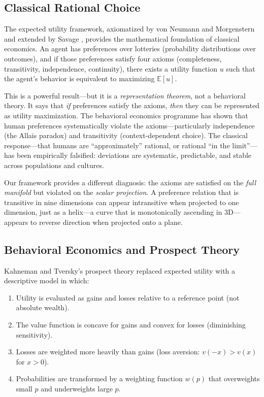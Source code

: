 \documentclass[12pt]{article}
\theoremstyle{definition}
\theoremstyle{remark}
\begin{document}
\subsection{Classical Rational Choice}

The expected utility framework, axiomatized by von Neumann and Morgenstern \cite{vonneumann1944} and extended by Savage \cite{savage1954}, provides the mathematical foundation of classical economics.  An agent has preferences over lotteries (probability distributions over outcomes), and if those preferences satisfy four axioms (completeness, transitivity, independence, continuity), there exists a utility function $u$ such that the agent's behavior is equivalent to maximizing $\mathbb{E}[u]$.

This is a powerful result---but it is a \emph{representation theorem}, not a behavioral theory.  It says that \emph{if} preferences satisfy the axioms, \emph{then} they can be represented as utility maximization.  The behavioral economics programme has shown that human preferences systematically violate the axioms---particularly independence (the Allais paradox) and transitivity (context-dependent choice).  The classical response---that humans are ``approximately'' rational, or rational ``in the limit''---has been empirically falsified: deviations are systematic, predictable, and stable across populations and cultures.

Our framework provides a different diagnosis: the axioms are satisfied on the \emph{full manifold} but violated on the \emph{scalar projection}.  A preference relation that is transitive in nine dimensions can appear intransitive when projected to one dimension, just as a helix---a curve that is monotonically ascending in 3D---appears to reverse direction when projected onto a plane.

\subsection{Behavioral Economics and Prospect Theory}

Kahneman and Tversky's prospect theory \cite{kahneman1979} replaced expected utility with a descriptive model in which:
\begin{enumerate}
    \item Utility is evaluated as gains and losses relative to a reference point (not absolute wealth).
    \item The value function is concave for gains and convex for losses (diminishing sensitivity).
    \item Losses are weighted more heavily than gains (loss aversion: $v(-x) > v(x)$ for $x > 0$).
    \item Probabilities are transformed by a weighting function $w(p)$ that overweights small $p$ and underweights large $p$.
\end{enumerate}
\end{document}
